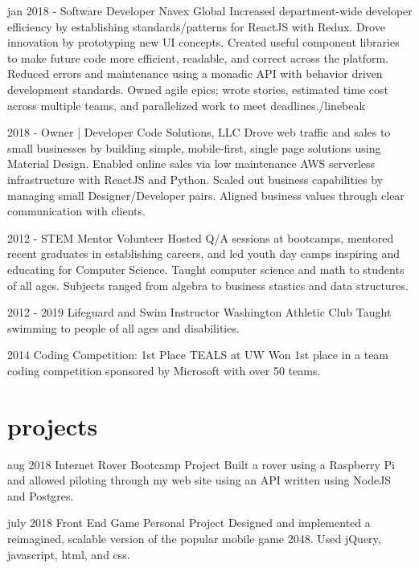 \documentclass[]{friggeri-cv}
\begin{document}
\begin{entrylist}
  \entry 
    {jan 2018 -}
    {Software Developer}
    {Navex Global}
    {Increased department-wide developer efficiency by establishing standards/patterns for ReactJS with Redux. Drove innovation by prototyping new UI concepts. Created useful component libraries to make future code more efficient, readable, and correct across the platform.\linebreak
    Reduced errors and maintenance using a monadic API with behavior driven development standards.\linebreak
    Owned agile epics; wrote stories, estimated time cost across multiple teams, and parallelized work to meet deadlines./linebeak
    }
  
  \entry 
    {2018 - }
    {Owner | Developer}
    {Code Solutions, LLC}
    {Drove web traffic and sales to small businesses by building simple, mobile-first, single page solutions using Material Design. \linebreak
    Enabled online sales via low maintenance AWS serverless infrastructure with ReactJS and Python. \linebreak
    Scaled out business capabilities by managing small Designer/Developer pairs. Aligned business values through clear communication with clients.}

 
  \entry
    {2012 -}
    {STEM Mentor Volunteer}
    {}
    {Hosted Q/A sessions at bootcamps, mentored recent graduates in establishing careers, and led youth day camps inspiring and educating for Computer Science.\linebreak
    Taught computer science and math to students of all ages. Subjects ranged from algebra to business stastics and data structures.}

  \entry
    {2012 - 2019}
    {Lifeguard and Swim Instructor}
    {Washington Athletic Club}
    {Taught swimming to people of all ages and disabilities.}

  \entry
    {2014}
    {Coding Competition: 1st Place}
    {TEALS at UW}
    {Won 1st place in a team coding competition sponsored by Microsoft with over 50 teams.}
  

\end{entrylist}

\section{projects}

\begin{entrylist}

  \entry
    {aug 2018}
    {Internet Rover}
    {Bootcamp Project}
    {Built a rover using a Raspberry Pi and allowed piloting through my web site using an API written using NodeJS and Postgres.}

  \entry
    {july 2018}
    {Front End Game}
    {Personal Project}
    {Designed and implemented a reimagined, scalable version of the popular mobile game 2048. Used jQuery, javascript, html, and css.}

\end{entrylist}
\end{document}
